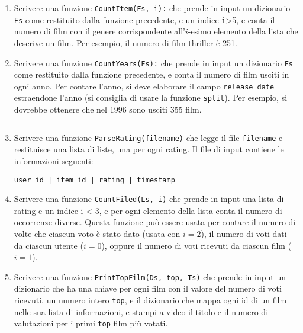 \documentclass[11pt,a4]{article}
\newcommand{\mybox}[2]{$\quad$\fbox{
\begin{minipage}{#1cm}
\hfill\vspace{#2cm}
\end{minipage}
}}
\begin{document}
\begin{enumerate}
\item Scrivere una funzione {\tt CountItem(Fs, i):} che prende in input un dizionario {\tt Fs} come
restituito dalla funzione precedente, e un indice {\tt i}>5, e conta il numero di film con il genere
corrispondente all'$i$-esimo elemento della lista che descrive un film. Per esempio,
il numero di film thriller è 251.

\item Scrivere una funzione {\tt CountYears(Fs):} che prende in input un dizionario {\tt Fs} come
restituito dalla funzione precedente, e conta il numero di film usciti in ogni anno. Per contare l'anno,
si deve elaborare il campo {\tt release date} estraendone l'anno (si consiglia di usare la funzione {\tt split}).
Per esempio, si dovrebbe ottenere che nel 1996 sono usciti 355 film.

\mybox{15}{2}

\item Scrivere una funzione {\tt ParseRating(filename)} che legge il file {\tt filename}
e restituisce una lista di liste, una per ogni rating.
Il file di input contiene le informazioni seguenti:
\begin{center}
{\tt user id | item id | rating | timestamp}
\end{center}

\item Scrivere una funzione {\tt CountFiled(Ls, i)} che prende in input una lista di rating
e un indice i < 3, e per ogni elemento della lista conta il numero di occorrenze diverse.
Questa funzione può essere usata per contare il numero di volte che ciascun voto è stato dato
(usata con $i=2$), il numero di voti dati da ciascun utente ($i=0$), oppure il numero
di voti ricevuti da ciascun film ($i=1$).

\item Scrivere una funzione {\tt PrintTopFilm(Ds, top, Ts)} che prende in input un
dizionario che ha una chiave per ogni film con il valore del numero di voti ricevuti,
un numero intero {\tt top}, e il dizionario che mappa ogni id di un film nelle sua lista di informazioni,
e stampi a video il titolo e il numero di valutazioni per i primi {\tt top} film più votati.

\mybox{15}{2}

\end{enumerate}
\end{document}
